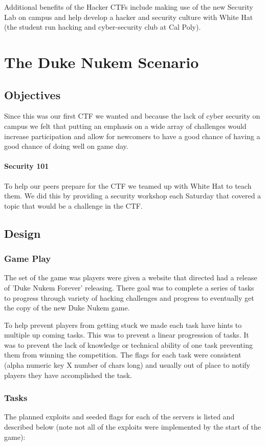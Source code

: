 \documentclass[10pt]{article}
\begin{document}
Additional benefits of the Hacker CTFs include making use of the new Security
Lab on campus and help develop a hacker and security culture with White Hat
(the student run hacking and cyber-security club at Cal Poly).

\section{The Duke Nukem Scenario}
\subsection{Objectives}
Since this was our first CTF we wanted and because the lack of cyber security
on campus we felt that putting an emphasis on a wide array of challenges
would increase participation and allow for newcomers to have a good chance of 
having a good chance of doing well on game day.

\paragraph*{Security 101}To help our peers prepare for the CTF we teamed up with
White Hat to teach them. We did this by providing a security workshop each Saturday
that covered a topic that would be a challenge in the CTF.

\subsection{Design}
\subsubsection{Game Play}
The set of the game was players were given a website that directed had a release of
'Duke Nukem Forever' releasing. There goal was to complete a series of tasks
to progress through variety of hacking challenges and progress to eventually get
the copy of the new Duke Nukem game.

To help prevent players from getting stuck we made each task have hints to multiple
up coming tasks. This was to prevent a linear progression of tasks. It was to prevent
the lack of knowledge or technical ability of one task preventing them from winning
the competition. The flags for each task were consistent (alpha numeric key X number
of chars long) and usually out of place to notify players they have accomplished
the task.

\subsubsection{Tasks}
\label{dntasks}
The planned exploits and seeded flags for each of the servers is listed and
described below (note not all of the exploits were implemented by the start of
the game):
\end{document}
